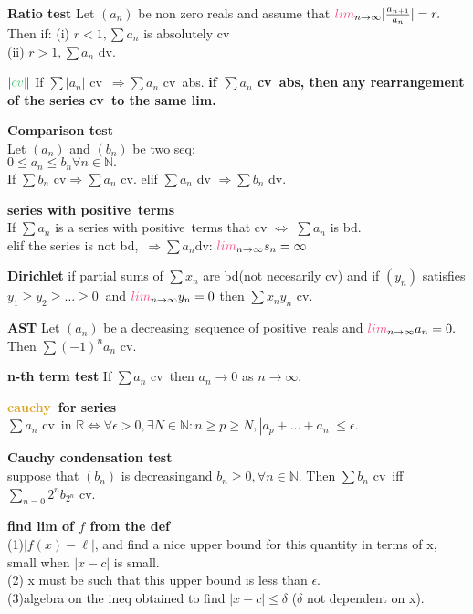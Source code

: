 \documentclass[10pt,landscape,a4paper]{article}
\def\line{

  \noindent{\color{mygray} \rule{\linewidth}{0.005mm}}

}
\def\R{\mathbb{R}}
\def\N{\mathbb{N}}
\def \bd{\textcolor{burgundy}{bd}}
\def\cv{\textcolor{emerald}{cv}}
\def\cauchy{\textcolor{goldenrod}{cauchy}}
\def\lim{\textcolor{frenchrose}{lim}}
\def\decreasing{\textcolor{twilightlavender}{decreasing}}
\def\positive{\textcolor{awesome}{positive}}
\newcommand\thm[1]{\line\textcolor{darklavender}{\bf#1}}
\newcommand\hint[1]{\textcolor{trolleygrey}{\bf#1}}
\newcommand\greenbox[1]{\line\textcolor{ferngreen}{\bf#1}}
\newcommand\LIMinfty{\lim_{n\to\infty}}
\begin{document}
\begin{multicols}{8}
\thm{Ratio test} Let $(a_n)$ be non zero reals and assume that $\LIMinfty |\frac{a_{n+1}}{a_n}| = r.$ Then if: (i) $r < 1, \sum a_n$ is absolutely \cv\.\\ (ii) $r > 1, \sum a_n$ dv.

\thm{$|\cv\|$} If $\sum|a_n|$ \cv\ $\Rightarrow \sum a_n$ \cv\ abs.
\hint{if $\sum a_n$ \cv\ abs, then any rearrangement of the series \cv\ to the same lim.}

\thm{Comparison test}\\
Let $(a_n)$ and $(b_n)$ be two seq: \\{$0 \leq a_n \leq b_n \forall n \in \N.$}\\
If $\sum b_n$ \cv $\Rightarrow \sum a_n$ \cv.
elif $\sum a_n$ dv $\Rightarrow \sum b_n$ dv.

\thm{series with \positive\ terms} \\
If $\sum a_n$ is a series with \positive\ terms that \cv 
$\Leftrightarrow$ $\sum a_n$ is \bd.\\ elif the series is not  \bd,\  $\Rightarrow  \sum a_n $dv: $\LIMinfty s_n = \infty$

\thm{Dirichlet} if partial sums of $\sum x_n$ are \bd (not necesarily \cv) and if $(y_n)$ satisfies $y_1 \geq y_2 \geq \hdots \geq 0\ $ and $\LIMinfty y_n = 0$ then $\sum x_n y_n$ \cv.

\thm{AST} Let $(a_n)$ be a \decreasing\ sequence of \positive\ reals and 
$\LIMinfty a_n = 0.$ Then $\sum(-1)^n a_n$ \cv.

\thm{n-th term test}
If $\sum a_n$ \cv\, then $a_n \to 0$ as $n \to \infty.$

\thm{\cauchy\ for series}\\ $\sum a_n$ \cv\ in $\R \Leftrightarrow \forall \epsilon > 0 , \exists N \in \N : n \geq p \geq N, |a_p + \hdots + a_n| \leq \epsilon.$

\thm{Cauchy condensation test}\\ suppose that $(b_n)$ is \decreasing and $b_n \geq 0, \forall n \in \N$. Then $\sum b_n$ \cv\ iff $\sum_{n=0} 2^{n} b_{2^n}$ \cv.


\greenbox{find lim of $f$ from the def}\\
(1)$|f(x) - \ell|$, and find a nice upper bound for this
quantity in terms of x, small when $|x - c|$ is small.\\
(2) x must be such that this upper bound is less than $\epsilon$.\\
(3)algebra on the ineq obtained to find  $|x - c| \leq \delta $ 
($\delta$ not dependent on x).


\end{multicols}
\end{document}

